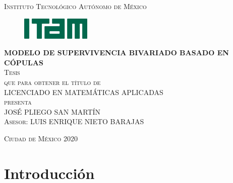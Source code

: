 \documentclass[11pt,a4paper]{article}
\begin{document}
\begin{titlepage}
\begin{center}

\textsc{\Large Instituto Tecnológico Autónomo de México}\\[4em]

\begin{figure}[h]
\begin{center}
\includegraphics{logo-ITAM_ch.jpg}
\end{center}
\end{figure}

\vspace{4em}

\textsc{\LARGE \textbf{MODELO DE SUPERVIVENCIA BIVARIADO BASADO EN CÓPULAS}}\\[4em]

\textsc{\large Tesis}\\[1em]

\textsc{que para obtener el título de}\\[1em]

\textsc{LICENCIADO EN MATEMÁTICAS APLICADAS}\\[1em]

\textsc{presenta}\\[1em]

\textsc{\Large JOSÉ PLIEGO SAN MARTÍN}\\[1em]

\textsc{\large Asesor: LUIS ENRIQUE NIETO BARAJAS}

\end{center}

\vspace*{\fill}
\textsc{Ciudad de México \hspace*{\fill} 2020}

\end{titlepage}

\tableofcontents
\listoffigures

\newpage

\setlength{\parindent}{0pt}

\section{Introducción}
\label{intro}
\end{document}
